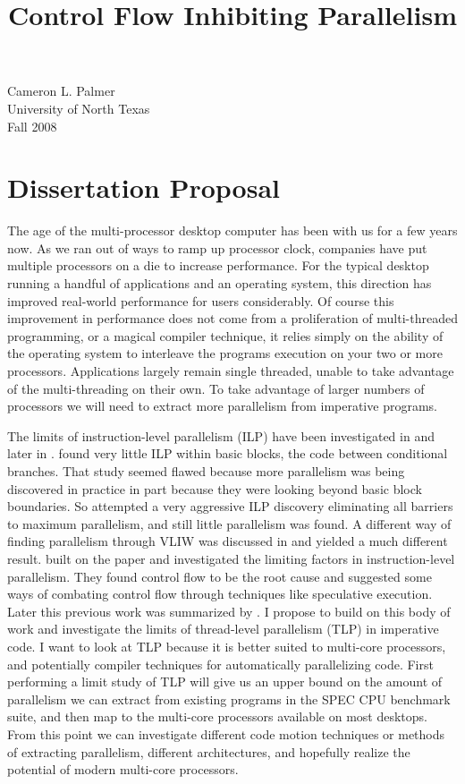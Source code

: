 \documentclass[12pt,twoside,letterpaper]{article}
\begin{document}
Cameron L. Palmer \\
University of North Texas \\
Fall 2008

\title{Control Flow Inhibiting Parallelism}

\section*{Dissertation	 Proposal}
The age of the multi-processor desktop computer has been with us for a few years now. As we ran out of ways to ramp up processor clock, companies have put multiple processors on a die to increase performance. For the typical desktop running a handful of applications and an operating system, this direction has improved real-world performance for users considerably. Of course this improvement in performance does not come from a proliferation of multi-threaded programming, or a magical compiler technique, it relies simply on the ability of the operating system to interleave the programs execution on your two or more processors. Applications largely remain single threaded, unable to take advantage of the multi-threading on their own. To take advantage of larger numbers of processors we will need to extract more parallelism from imperative programs.

The limits of instruction-level parallelism (ILP) have been investigated in \cite{Tjaden:1970p214} and later in \cite{Wall:1991p191}. \cite{Tjaden:1970p214} found very little ILP within basic blocks, the code between conditional branches. That study seemed flawed because more parallelism was being discovered in practice in part because they were looking beyond basic block boundaries. So \cite{Wall:1991p191} attempted a very aggressive ILP discovery eliminating all barriers to maximum parallelism, and still little parallelism was found. A different way of finding parallelism through VLIW was discussed in \cite{Nicolau:1984p217} and yielded a much different result. \cite{Lam:1992p188} built on the \cite{Wall:1991p191} paper and investigated the limiting factors in instruction-level parallelism. They found control flow to be the root cause and suggested some ways of combating control flow through techniques like speculative execution. Later this previous work was summarized by \cite{Rau:1992p211}. I propose to build on this body of work and investigate the limits of thread-level parallelism (TLP) in imperative code. I want to look at TLP because it is better suited to multi-core processors, and potentially compiler techniques for automatically parallelizing code. First performing a limit study of TLP will give us an upper bound on the amount of parallelism we can extract from existing programs in the SPEC CPU benchmark suite, and then map to the multi-core processors available on most desktops. From this point we can investigate different code motion techniques or methods of extracting parallelism, different architectures, and hopefully realize the potential of modern multi-core processors.
\end{document}
